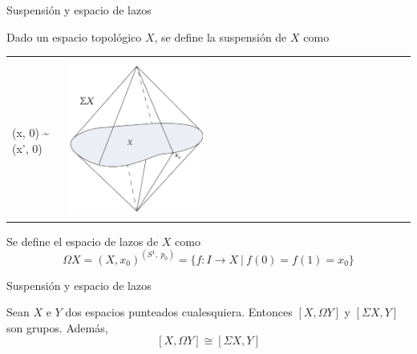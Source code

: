 \begin{frame}{Suspensión y espacio de lazos}
\begin{defin}
Dado un espacio topológico $X$, se define la suspensión de $X$ como
\begin{tabular}{ll}
\begin{minipage}{0.5\textwidth}
\[ \Sigma X =  \faktor{X \times I}
{ \footnotesize{\begin{matrix}
(x, 1) \sim (x', 1) \\
(x, 0) \sim (x', 0)
\end{matrix}}} \] 
\end{minipage}
&
\begin{minipage}{0.5\textwidth}
\includegraphics[width=0.4\textwidth]{images/suspension.pdf}
\end{minipage}
\end{tabular}
\end{defin}
\pause
\begin{defin}
Se define el espacio de lazos de $X$ como
\[
\Omega X = (X, x_0)^{(S^1, \ p_0)} = \{ f : I \longrightarrow X \ \vert \ f(0) = f(1) = x_0 \}
\]
\end{defin}
\end{frame}
\begin{frame}{Suspensión y espacio de lazos}
\begin{teor}
Sean $X$ e $Y$ dos espacios punteados cualesquiera. Entonces
$[X, \Omega Y]$ y $[\Sigma X, Y]$ son grupos. Además,
\[ [X, \Omega Y] \cong [\Sigma X, Y] \]
\end{teor}

\end{frame}